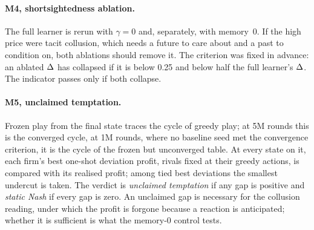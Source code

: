 \paragraph{M4, shortsightedness ablation.} The full learner is rerun with $\gamma = 0$ and, separately, with memory~0. If the high price were tacit collusion, which needs a future to care about and a past to condition on, both ablations should remove it. The criterion was fixed in advance: an ablated $\Delta$ has collapsed if it is below 0.25 and below half the full learner's $\Delta$. The indicator passes only if both collapse.

\paragraph{M5, unclaimed temptation.} Frozen play from the final state traces the cycle of greedy play; at 5M rounds this is the converged cycle, at 1M rounds, where no baseline seed met the convergence criterion, it is the cycle of the frozen but unconverged table. At every state on it, each firm's best one-shot deviation profit, rivals fixed at their greedy actions, is compared with its realised profit; among tied best deviations the smallest undercut is taken. The verdict is \emph{unclaimed temptation} if any gap is positive and \emph{static Nash} if every gap is zero. An unclaimed gap is necessary for the collusion reading, under which the profit is forgone because a reaction is anticipated; whether it is sufficient is what the memory-0 control tests.

